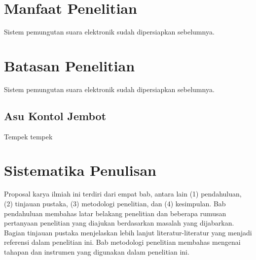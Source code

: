 \section{Manfaat Penelitian}
Sistem pemungutan suara elektronik sudah dipersiapkan sebelumnya.



\section{Batasan Penelitian}
Sistem pemungutan suara elektronik sudah dipersiapkan sebelumnya.


\subsection{Asu Kontol Jembot}
Tempek tempek

\section{Sistematika Penulisan}
Proposal karya ilmiah ini terdiri dari empat bab, antara lain (1) pendahuluan, (2) tinjauan pustaka, (3) metodologi penelitian, dan (4) kesimpulan. Bab pendahuluan membahas latar belakang penelitian dan beberapa rumusan pertanyaan penelitian yang diajukan berdasarkan masalah yang dijabarkan. Bagian tinjauan pustaka menjelaskan lebih lanjut literatur-literatur yang menjadi referensi dalam penelitian ini. Bab metodologi penelitian membahas mengenai tahapan dan instrumen yang digunakan dalam penelitian ini.